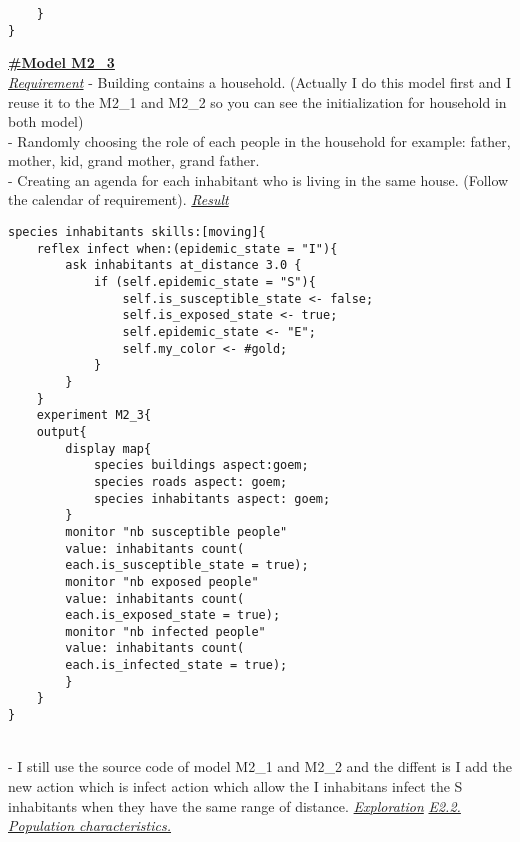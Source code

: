 \documentclass{article}
\begin{document}
\begin{pic15}
\begin{pic15}
\begin{tcolorbox}
\begin{lstlisting}
	}
}
\end{lstlisting}
\end{tcolorbox}
\newpage
\underline{\textbf{#Model M2\_3}}\\
\newline\newline
\underline{\emph{Requirement}}
\newline\newline
- Building contains a household. (Actually I do this model first and I reuse it to the M2\_1 and M2\_2 so you can see the initialization for household in both model)
\\
- Randomly choosing the role of each people in the household for example: father, mother, kid, grand mother, grand father.
\\
- Creating an agenda for each inhabitant who is living in the same house. (Follow the calendar of requirement).
\newline\newline
\underline{\emph{Result}}\newline\newline
\begin{tcolorbox}
\begin{lstlisting}
species inhabitants skills:[moving]{
	reflex infect when:(epidemic_state = "I"){
		ask inhabitants at_distance 3.0 {
			if (self.epidemic_state = "S"){
				self.is_susceptible_state <- false;
				self.is_exposed_state <- true;
				self.epidemic_state <- "E";
				self.my_color <- #gold;
			}
		}
	}
	experiment M2_3{
	output{
		display map{
			species buildings aspect:goem;
			species roads aspect: goem;
			species inhabitants aspect: goem;
		}
		monitor "nb susceptible people" 
		value: inhabitants count(
		each.is_susceptible_state = true);
		monitor "nb exposed people" 
		value: inhabitants count(
		each.is_exposed_state = true);
		monitor "nb infected people" 
		value: inhabitants count(
		each.is_infected_state = true);
		}
	}
}
\end{lstlisting}
\end{tcolorbox}
\newpage
\\- I still use the source code of model M2\_1 and M2\_2 and the diffent is I add the new action which is infect action which allow the I inhabitans infect the S inhabitants when they have the same range of distance.
\newline\newline
\underline{\emph{Exploration}}
\newline\newline
\underline{\textit{E2.2. Population characteristics.}}

\end{pic15}
\end{pic15}
\end{document}
